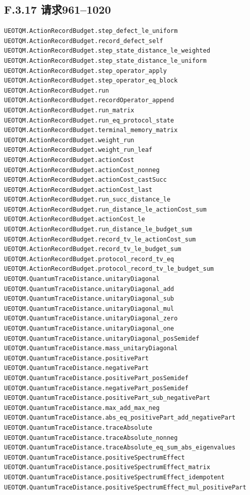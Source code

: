 \documentclass[
  11pt,
  oneside]{book}
\begin{document}
\subsection{F.3.17 请求961--1020}

\begin{Verbatim}[breaklines,breakanywhere,fontsize=\scriptsize]
UEOTQM.ActionRecordBudget.step_defect_le_uniform
UEOTQM.ActionRecordBudget.record_defect_self
UEOTQM.ActionRecordBudget.step_state_distance_le_weighted
UEOTQM.ActionRecordBudget.step_state_distance_le_uniform
UEOTQM.ActionRecordBudget.step_operator_apply
UEOTQM.ActionRecordBudget.step_operator_eq_block
UEOTQM.ActionRecordBudget.run
UEOTQM.ActionRecordBudget.recordOperator_append
UEOTQM.ActionRecordBudget.run_matrix
UEOTQM.ActionRecordBudget.run_eq_protocol_state
UEOTQM.ActionRecordBudget.terminal_memory_matrix
UEOTQM.ActionRecordBudget.weight_run
UEOTQM.ActionRecordBudget.weight_run_leaf
UEOTQM.ActionRecordBudget.actionCost
UEOTQM.ActionRecordBudget.actionCost_nonneg
UEOTQM.ActionRecordBudget.actionCost_castSucc
UEOTQM.ActionRecordBudget.actionCost_last
UEOTQM.ActionRecordBudget.run_succ_distance_le
UEOTQM.ActionRecordBudget.run_distance_le_actionCost_sum
UEOTQM.ActionRecordBudget.actionCost_le
UEOTQM.ActionRecordBudget.run_distance_le_budget_sum
UEOTQM.ActionRecordBudget.record_tv_le_actionCost_sum
UEOTQM.ActionRecordBudget.record_tv_le_budget_sum
UEOTQM.ActionRecordBudget.protocol_record_tv_eq
UEOTQM.ActionRecordBudget.protocol_record_tv_le_budget_sum
UEOTQM.QuantumTraceDistance.unitaryDiagonal
UEOTQM.QuantumTraceDistance.unitaryDiagonal_add
UEOTQM.QuantumTraceDistance.unitaryDiagonal_sub
UEOTQM.QuantumTraceDistance.unitaryDiagonal_mul
UEOTQM.QuantumTraceDistance.unitaryDiagonal_zero
UEOTQM.QuantumTraceDistance.unitaryDiagonal_one
UEOTQM.QuantumTraceDistance.unitaryDiagonal_posSemidef
UEOTQM.QuantumTraceDistance.mass_unitaryDiagonal
UEOTQM.QuantumTraceDistance.positivePart
UEOTQM.QuantumTraceDistance.negativePart
UEOTQM.QuantumTraceDistance.positivePart_posSemidef
UEOTQM.QuantumTraceDistance.negativePart_posSemidef
UEOTQM.QuantumTraceDistance.positivePart_sub_negativePart
UEOTQM.QuantumTraceDistance.max_add_max_neg
UEOTQM.QuantumTraceDistance.abs_eq_positivePart_add_negativePart
UEOTQM.QuantumTraceDistance.traceAbsolute
UEOTQM.QuantumTraceDistance.traceAbsolute_nonneg
UEOTQM.QuantumTraceDistance.traceAbsolute_eq_sum_abs_eigenvalues
UEOTQM.QuantumTraceDistance.positiveSpectrumEffect
UEOTQM.QuantumTraceDistance.positiveSpectrumEffect_matrix
UEOTQM.QuantumTraceDistance.positiveSpectrumEffect_idempotent
UEOTQM.QuantumTraceDistance.positiveSpectrumEffect_mul_positivePart

\end{Verbatim}
\end{document}
